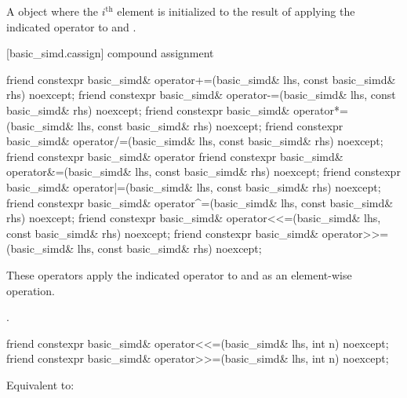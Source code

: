 \begin{itemdescr}
  \pnum\ConstraintOperatorTWellFormed

  \pnum\returns
  A  object where the $i^\text{th}$ element is initialized to the result of applying the indicated operator to  and  \foralli.
\end{itemdescr}

[basic_simd.cassign]{ compound assignment}

\begin{itemdecl}
friend constexpr basic_simd& operator+=(basic_simd& lhs, const basic_simd& rhs) noexcept;
friend constexpr basic_simd& operator-=(basic_simd& lhs, const basic_simd& rhs) noexcept;
friend constexpr basic_simd& operator*=(basic_simd& lhs, const basic_simd& rhs) noexcept;
friend constexpr basic_simd& operator/=(basic_simd& lhs, const basic_simd& rhs) noexcept;
friend constexpr basic_simd& operator%
friend constexpr basic_simd& operator&=(basic_simd& lhs, const basic_simd& rhs) noexcept;
friend constexpr basic_simd& operator|=(basic_simd& lhs, const basic_simd& rhs) noexcept;
friend constexpr basic_simd& operator^=(basic_simd& lhs, const basic_simd& rhs) noexcept;
friend constexpr basic_simd& operator<<=(basic_simd& lhs, const basic_simd& rhs) noexcept;
friend constexpr basic_simd& operator>>=(basic_simd& lhs, const basic_simd& rhs) noexcept;
\end{itemdecl}

\begin{itemdescr}
  \pnum\ConstraintOperatorTWellFormed

  \pnum\effects
  These operators apply the indicated operator to  and  as an element-wise operation.

  \pnum\returns
  .
\end{itemdescr}

\begin{itemdecl}
friend constexpr basic_simd& operator<<=(basic_simd& lhs, int n) noexcept;
friend constexpr basic_simd& operator>>=(basic_simd& lhs, int n) noexcept;
\end{itemdecl}

\begin{itemdescr}
  \pnum\ConstraintOperatorTWellFormed

  \pnum\effects
  Equivalent to: 
\end{itemdescr}

